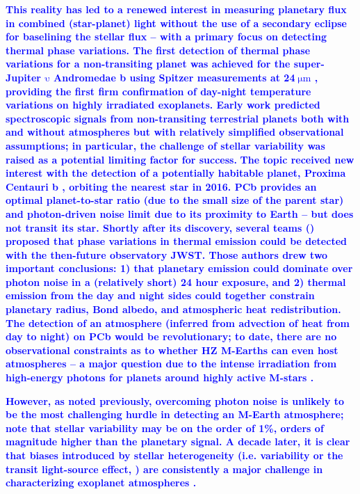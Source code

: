 \documentclass[twocolumn,linenumbers]{aastex7}
\newcommand{\update}[1]{\textcolor{blue}{\bf #1}}
\begin{document}
\update{
    This reality has led to a renewed interest in measuring planetary flux in combined (star-planet) light without the use of a secondary eclipse for baselining the stellar flux -- with a primary focus on detecting thermal phase variations.  The first detection of thermal phase variations for a non-transiting planet was achieved for the super-Jupiter $\mathrm{\upsilon}$ Andromedae b using Spitzer measurements at 24$\;\mathrm{\mu m}$ \citep{harrington2006,crossfield2010}, providing the first firm confirmation of day-night temperature variations on highly irradiated exoplanets. Early work predicted spectroscopic signals from non-transiting terrestrial planets both with \citep{selsis2011} and without \citep{maurin2012} atmospheres but with relatively simplified observational assumptions; in particular, the challenge of stellar variability was raised as a potential limiting factor for success.
}   
\update{
    The topic received new interest with the detection of a potentially habitable planet, Proxima Centauri b \citep[PCb,][]{anglada-escude2016}, orbiting the nearest star in 2016.  PCb provides an optimal planet-to-star ratio (due to the small size of the parent star) and photon-driven noise limit due to its proximity to Earth -- but does not transit its star. Shortly after its discovery, several teams (\citet{turbet2016, kreidberg2016}) proposed that phase variations in thermal emission could be detected with the then-future observatory JWST. Those authors drew two important conclusions: 1) that planetary emission could dominate over photon noise in a (relatively short) 24 hour exposure, and 2) thermal emission from the day and night sides could together constrain planetary radius, Bond albedo, and atmospheric heat redistribution. The detection of an atmosphere (inferred from advection of heat from day to night) on PCb would be revolutionary; to date, there are no observational constraints as to whether HZ M-Earths can even host atmospheres -- a major question due to the intense irradiation from high-energy photons for planets around highly active M-stars \citep[e.g.][]{airapetian2017,pass2025}.
}

\update{
    However, as noted previously, overcoming photon noise is unlikely to be the most challenging hurdle in detecting an M-Earth atmosphere; \citet{kreidberg2016} note that stellar variability may be on the order of 1\%, orders of magnitude higher than the planetary signal. A decade later, it is clear that biases introduced by stellar heterogeneity (i.e. variability or the transit light-source effect, \citealp{rackham2018}) are consistently a major challenge in characterizing exoplanet atmospheres \citep{moran2023,sotzen2025}.
}
\end{document}
